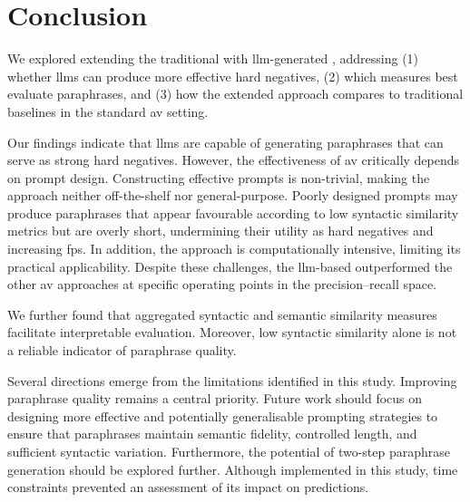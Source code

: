 \chapter{Conclusion}
\label{chap:conclusion}

We explored extending the traditional \impAppr{} with \ac{llm}-generated \imps{}, addressing (1) whether \acp{llm} can produce more effective hard negatives, (2) which measures best evaluate paraphrases, and (3) how the extended approach compares to traditional baselines in the standard \ac{av} setting.

Our findings indicate that \acp{llm} are capable of generating paraphrases that can serve as strong hard negatives. 
However, the effectiveness of \ac{av} critically depends on prompt design. 
Constructing effective prompts is non-trivial, making the approach neither off-the-shelf nor general-purpose. 
Poorly designed prompts may produce paraphrases that appear favourable according to low syntactic similarity metrics but are overly short, undermining their utility as hard negatives and increasing \acp{fp}. 
In addition, the approach is computationally intensive, limiting its practical applicability. 
Despite these challenges, the \ac{llm}-based \impAppr{} outperformed the other \ac{av} approaches at specific operating points in the precision–recall space.

We further found that aggregated syntactic and semantic similarity measures facilitate interpretable evaluation. Moreover, low syntactic similarity alone is not a reliable indicator of paraphrase quality. 




Several directions emerge from the limitations identified in this study. 
Improving paraphrase quality remains a central priority. 
Future work should focus on designing more effective and potentially generalisable prompting strategies to ensure that paraphrases maintain semantic fidelity, controlled length, and sufficient syntactic variation.  
%
Furthermore, the potential of two-step paraphrase generation should be explored further. 
Although implemented in this study, time constraints prevented an assessment of its impact on \impAppr{} predictions. 

